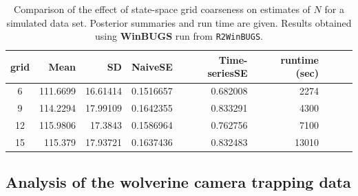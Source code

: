 \begin{table}
\centering
\caption{
Comparison of the
effect of state-space grid coarseness on estimates of $N$ for a
simulated data set. Posterior
summaries and run time are given. Results obtained  using
{\bf WinBUGS} run from {\tt R2WinBUGS}.
}
\begin{tabular}{crrrrrrrc} \hline \hline
grid  & Mean & SD &   NaiveSE & Time-seriesSE &  runtime (sec) \\ \hline
6     &    111.6699& 16.61414& 0.1516657 &  0.682008 &     2274 \\
9     &    114.2294& 17.99109& 0.1642355 &  0.833291 &    4300 \\
12    &    115.9806& 17.3843 & 0.1586964 &  0.762756 &    7100 \\
15    &    115.379 & 17.93721& 0.1637436 &  0.832483 &   13010 \\
\hline
\end{tabular}
\label{scr0.tab.discrete}
\end{table}

\subsection{Analysis of the wolverine camera trapping data}
\label{scr0.sec.wolvgrid}

